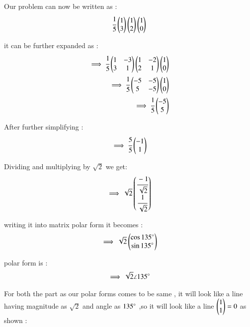 \begin{enumerate}[label=\thesection.\arabic*.,ref=\thesection.\theenumi]
\begin{enumerate}
Our problem can now be written as :
\begin{align}
    \cfrac{1}{5}\begin{pmatrix}1 \\ 3\end{pmatrix}\begin{pmatrix}1\\2\end{pmatrix}\begin{pmatrix}1\\0\end{pmatrix}
\end{align}

it can be further expanded as :
\begin{align}
    \implies \cfrac{1}{5}\begin{pmatrix}1 & -3\\3 & 1\end{pmatrix}\begin{pmatrix}1 & -2\\2 & 1\end{pmatrix}\begin{pmatrix}1 \\ 0\end{pmatrix}
\\
    \implies \cfrac{1}{5}\begin{pmatrix}-5 & -5\\5 & -5\end{pmatrix}\begin{pmatrix}1 \\ 0\end{pmatrix}
\\
    \implies \cfrac{1}{5}\begin{pmatrix}-5 \\ 5\end{pmatrix}
\end{align}

After further simplifying :
\begin{align}
    \implies \cfrac{5 }{5}\begin{pmatrix}-1 \\ 1\end{pmatrix}
\end{align}

Dividing and multiplying by $\sqrt{2}$ we get:
\begin{align}
    \implies \sqrt{2}\begin{pmatrix}\cfrac{-1}{\sqrt{2}} \\ \cfrac{1}{\sqrt{2}}\end{pmatrix}
\end{align}

writing it into matrix polar form it becomes :
\begin{align}
    \implies \sqrt{2}\begin{pmatrix}\cos{135}\degree \\ \sin{135}\degree\end{pmatrix}
\end{align}

polar form is :
\begin{align}
    \implies \sqrt{2} \angle 135 \degree
\end{align}

For both the part as our polar forms comes to be same , it will look like a line having magnitude as $\sqrt{2}$ and angle as $135\degree$
,so it will look like a line $\begin{pmatrix}1 \\ 1\end{pmatrix}=0$ as shown :


\end{enumerate}
\end{enumerate}
